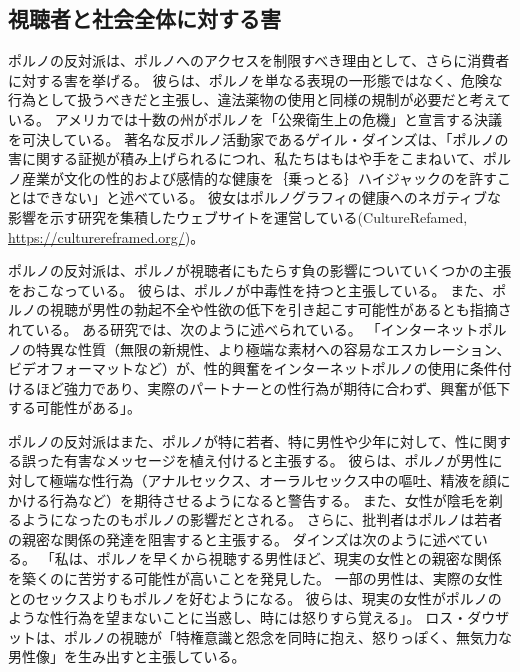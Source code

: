 \documentclass[paper=a4,book,openany]{jlreq}
\begin{document}
\subsection{視聴者と社会全体に対する害}

ポルノの反対派は、ポルノへのアクセスを制限すべき理由として、さらに消費者に対する害を挙げる。
彼らは、ポルノを単なる表現の一形態ではなく、危険な行為として扱うべきだと主張し、違法薬物の使用と同様の規制が必要だと考えている。
アメリカでは十数の州がポルノを「公衆衛生上の危機」と宣言する決議を可決している\citep{quinn19:_is_porn_public_healt_crisis}。
著名な反ポルノ活動家であるゲイル・ダインズは、「ポルノの害に関する証拠が積み上げられるにつれ、私たちはもはや手をこまねいて、ポルノ産業が文化の性的および感情的な健康を｛乗っとる｝{ハイジャック}のを許すことはできない」と述べている\citep{dines16:_why_porn_is_public_healt_issue}。
彼女はポルノグラフィの健康へのネガティブな影響を示す研究を集積したウェブサイトを運営している(CultureRefamed, \url{https://culturereframed.org/})。

ポルノの反対派は、ポルノが視聴者にもたらす負の影響についていくつかの主張をおこなっている。
彼らは、ポルノが中毒性を持つと主張している\citep{snagowski15:_implic_assoc_cyber_addic}。
また、ポルノの視聴が男性の勃起不全や性欲の低下を引き起こす可能性があるとも指摘されている。
ある研究では、次のように述べられている。
「インターネットポルノの特異な性質（無限の新規性、より極端な素材への容易なエスカレーション、ビデオフォーマットなど）が、性的興奮をインターネットポルノの使用に条件付けるほど強力であり、実際のパートナーとの性行為が期待に合わず、興奮が低下する可能性がある」\citep[p.1]{park16:_is_inter_pornog_causin_sexual_dysfun}。

ポルノの反対派はまた、ポルノが特に若者、特に男性や少年に対して、性に関する誤った有害なメッセージを植え付けると主張する。
彼らは、ポルノが男性に対して極端な性行為（アナルセックス、オーラルセックス中の嘔吐、精液を顔にかける行為など）を期待させるようになると警告する。
また、女性が陰毛を剃るようになったのもポルノの影響だとされる\citep{fetters11:_new_full_front}。
さらに、批判者はポルノは若者の親密な関係の発達を阻害すると主張する。
ダインズは次のように述べている。
「私は、ポルノを早くから視聴する男性ほど、現実の女性との親密な関係を築くのに苦労する可能性が高いことを発見した。
一部の男性は、実際の女性とのセックスよりもポルノを好むようになる。
彼らは、現実の女性がポルノのような性行為を望まないことに当惑し、時には怒りすら覚える」\citep{bindel10:_truth_porn_indus}。
ロス・ダウザットは、ポルノの視聴が「特権意識と怨念を同時に抱え、怒りっぽく、無気力な男性像」を生み出すと主張している\citep{douthat18:_lets_ban_porn}。
\end{document}
